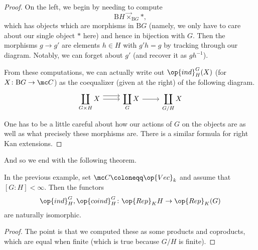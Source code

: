 \documentclass[../notes.tex]{subfiles}
\begin{document}
\begin{proof}
	On the left, we begin by needing to compute
	\[\mathrm BH\vec\times_{\mathrm BG}*,\]
	which has objects which are morphisms in $\mathrm BG$ (namely, we only have to care about our single object $*$ here) and hence in bijection with $G$. Then the morphisms $g\to g'$ are elements $h\in H$ with $g'h=g$ by tracking through our diagram. Notably, we can forget about $g'$ (and recover it as $gh^{-1}$).

	From these computations, we can actually write out $\op{ind}^G_H(X)$ (for $X\colon\mathrm BG\to\mc C$) as the coequalizer (given at the right) of the following diagram.
	\[\begin{tikzcd}
		{\displaystyle\coprod_{G\times H}X} & {\displaystyle\coprod_{G}X} & {\displaystyle\coprod_{G/H}X}
		\arrow[from=1-1, to=1-2]
		\arrow[from=1-2, to=1-3]
		\arrow[shift left=2, from=1-1, to=1-2]
	\end{tikzcd}\]
	One has to be a little careful about how our actions of $G$ on the objects are as well as what precisely these morphisms are. There is a similar formula for right Kan extensions.
\end{proof}
And so we end with the following theorem.
\begin{theorem}
	In the previous example, set $\mc C\coloneqq\op{Vec}_k$ and assume that $[G:H]<\infty$. Then the functors
	\[\op{ind}^G_H,\op{coind}^G_H\colon\op{Rep}_KH\to\op{Rep}_K(G)\]
	are naturally isomorphic.
\end{theorem}
\begin{proof}
	The point is that we computed these as some products and coproducts, which are equal when finite (which is true because $G/H$ is finite).
\end{proof}
\end{document}
